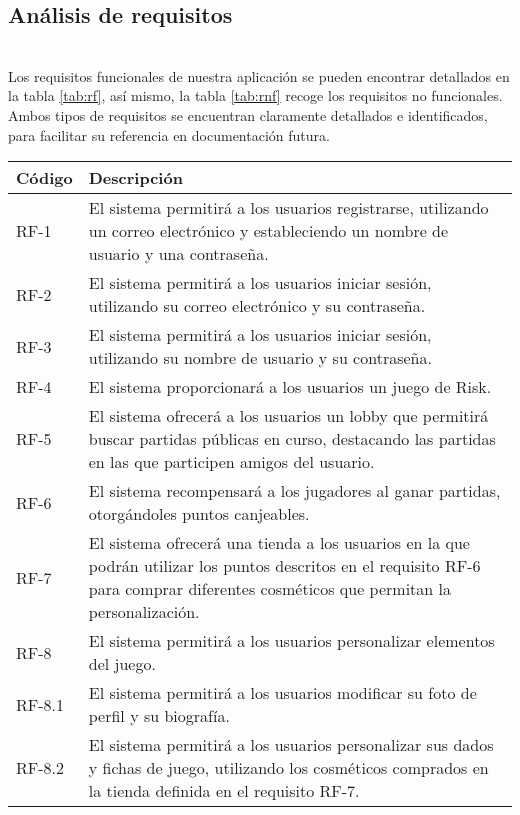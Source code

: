 \documentclass[12pt, a4paper, titlepage]{article}
\begin{document}
\subsection{Análisis de requisitos}
\\ Los requisitos funcionales de nuestra aplicación se pueden encontrar detallados en la tabla \ref{tab:rf}, así mismo, la tabla \ref{tab:rnf} recoge los requisitos no funcionales. Ambos tipos de requisitos se encuentran claramente detallados e identificados, para facilitar su referencia en documentación futura.
\begin{longtable}
    \centering
    \begin{tabularx}{\textwidth}{|l|X|}
    \hline
         Código & Descripción  \\
         \hline
         RF-1 & El sistema permitirá a los usuarios registrarse, utilizando un correo electrónico y estableciendo un nombre de usuario y una contraseña.\\
         RF-2 & El sistema permitirá a los usuarios iniciar sesión, utilizando su correo electrónico y su contraseña.\\
         RF-3 & El sistema permitirá a los usuarios iniciar sesión, utilizando su nombre de usuario y su contraseña.\\
         RF-4 & El sistema proporcionará a los usuarios un juego de Risk.\\
         RF-5 & El sistema ofrecerá a los usuarios un lobby que permitirá buscar partidas públicas en curso, destacando las partidas en las que participen amigos del usuario.\\
         RF-6 & El sistema recompensará a los jugadores al ganar partidas, otorgándoles puntos canjeables.\\
         RF-7 & El sistema ofrecerá una tienda a los usuarios en la que podrán utilizar los puntos descritos en el requisito RF-6 para comprar diferentes cosméticos que permitan la personalización. \\
         RF-8 & El sistema permitirá a los usuarios personalizar elementos del juego.\\
         RF-8.1 & El sistema permitirá a los usuarios modificar su foto de perfil y su biografía.\\
         RF-8.2 & El sistema permitirá a los usuarios personalizar sus dados y fichas de juego, utilizando los cosméticos comprados en la tienda definida en el requisito RF-7.\\

\end{tabularx}
\end{longtable}
\end{document}
